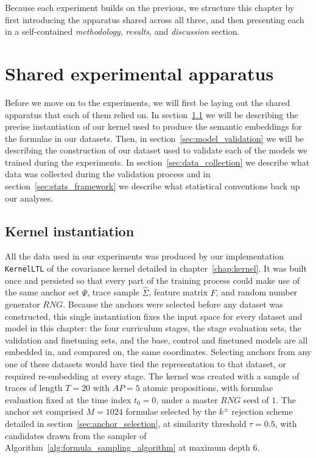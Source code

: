 \documentclass[titlepage,a4paper,11pt]{report}
\begin{document}
    Because each experiment builds on the previous, we structure this chapter by first introducing the apparatus shared across all three, and then presenting each in a self-contained \textit{methodology}, \textit{results}, and \textit{discussion} section.
    
    
    \section{Shared experimental apparatus}\label{sec:shared_apparatus}
    Before we move on to the experiments, we will first be laying out the shared apparatus that each of them relied on. In section~\ref{sec:kernel_instantiation} we will be describing the precise instantiation of our kernel used to produce the semantic embeddings for the formulae in our datasets. Then, in section~\ref{sec:model_validation} we will be describing the construction of our dataset used to validate each of the models we trained during the experiments. In section~\ref{sec:data_collection} we describe what data was collected during the validation process and in section~\ref{sec:stats_framework} we describe what statistical conventions back up our analyses.  
    
    \subsection{Kernel instantiation}\label{sec:kernel_instantiation}
    All the data used in our experiments was produced by our implementation \texttt{KernelLTL} of the covariance kernel detailed in chapter~\ref{chap:kernel}. It was built once and persisted so that every part of the training process could make use of the same anchor set $\Psi$, trace sample $\widehat \Sigma$, feature matrix $F$, and random number generator $RNG$. Because the anchors were selected before any dataset was constructed, this single instantiation fixes the input space for every dataset and model in this chapter: the four curriculum stages, the stage evaluation sets, the validation and finetuning sets, and the base, control and finetuned models are all embedded in, and compared on, the same coordinates. Selecting anchors from any one of these datasets would have tied the representation to that dataset, or required re-embedding at every stage. The kernel was created with a sample of traces of length $T = 20$ with $\mathit{AP} = 5$ atomic propositions, with formulae evaluation fixed at the time index $t_0 = 0$, under a master $RNG$ seed of $1$. The anchor set comprised $M = 1024$ formulae selected by the $k^{\pm}$ rejection scheme detailed in section~\ref{sec:anchor_selection}, at similarity threshold $\tau = 0.5$, with candidates drawn from the sampler of Algorithm~\ref{alg:formula_sampling_algorithm} at maximum depth $6$.
    
\end{document}
